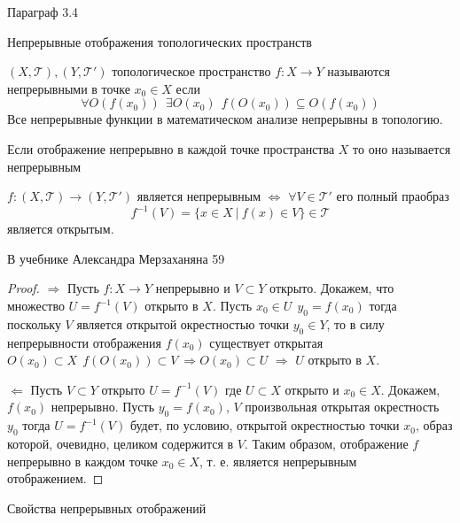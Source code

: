 \begin{title}[\Large]
  Параграф 3.4
\end{title}

\begin{title}[\Large]
  Непрерывные отображения топологических пространств
\end{title}

\begin{define}[непрерывности]
  $(X, \mathcal{T}), (Y, \mathcal{T}')$ топологическое пространство
  $f: X \to Y$ называются непрерывными в точке $x_0 \in X$ если
  $$
  \forall O(f(x_0)) ~~ \exists O(x_0) ~~ f(O(x_0)) \subseteq O(f(x_0))
  $$
  Все непрерывные функции в математическом анализе непрерывны в топологию.

  Если отображение непрерывно в каждой точке пространства $X$ то оно
  называется непрерывным
\end{define}

\begin{theorem}
  $f:(X, \mathcal{T}) \to (Y, \mathcal{T}')$ является непрерывным
  $\Leftrightarrow$ $\forall V \in \mathcal{T}'$ его полный праобраз
  $$
  f^{-1}(V) = \{ x \in X ~ | ~ f(x) \in V \} \in \mathcal{T}
  $$
  является открытым.

  В учебнике Александра Мерзаханяна 59
\end{theorem}

\begin{proof}
  $\Rightarrow$ Пусть $f: X \to Y$ непрерывно и $V \subset Y$ открыто. Докажем,
  что множество $U = f^{-1}(V)$ открыто в $X$.
  Пусть $x_0 \in U ~~ y_0 = f(x_0)$ тогда поскольку $V$ является
  открытой окрестностью точки $y_0 \in Y$, то в силу непрерывности
  отображения $f(x_0)$ существует открытая $O(x_0) \subset X ~~
  f(O(x_0))\subset V ~ \Rightarrow O(x_0) \subset U$ $\Rightarrow$ $U$ открыто в $X$.

  $\Leftarrow$ Пусть $V \subset Y$ открыто $U = f^{-1}(V)$ где $U \subset X$ открыто
  и $x_0 \in X$. Докажем, $f(x_0)$ непрерывно. Пусть
  $y_0 = f(x_0)$, $V$ произвольная открытая окрестность $y_0$ тогда
  $U = f^{-1}(V)$ будет, по условию, открытой окрестностью точки $x_0$, образ
  которой, очевидно, целиком содержится в $V$. Таким образом, отображение $f$
  непрерывно в каждом точке $x_0 \in X$, т. е. является непрерывным отображением.
\end{proof}

\begin{title}[\Large]
  Свойства непрерывных отображений
\end{title}

